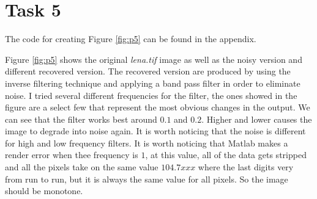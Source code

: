 \section{Task 5}

The code for creating Figure \ref{fig:p5} can be found in the appendix.


Figure \ref{fig:p5} shows the original \textit{lena.tif} image as well as the noisy version and
different recovered version. The recovered version are produced by using the inverse filtering
technique and applying a band pass filter in order to eliminate noise. I tried several different
frequencies for the filter, the ones showed in the figure are a select few that represent the most
obvious changes in the output. We can see that the filter works best around $0.1$ and $0.2$.
Higher and lower causes the image to degrade into noise again. It is worth noticing that the noise
is different for high and low frequency filters. It is worth noticing that Matlab makes a render
error when thee frequency is $1$, at this value, all of the data gets stripped and all the pixels
take on the same value $104.7xxx$ where the last digits very from run to run, but it is always the
same value for all pixels. So the image should be monotone.